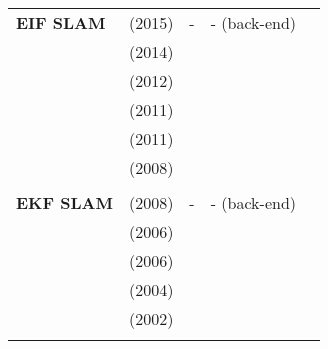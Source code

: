 \documentclass[a4paper,12pt]{scrartcl}
\begin{document}
{\begin{longtable}{l|l|l|l|l}
    \textbf{EIF SLAM}      & \cite{Samsuri2015} (2015)         & -                                                                  & - (back-end)          &\\
                           & \cite{Sola2014} (2014)            &                                                                    &                       &\\
                           & \cite{Kurt-Yavuz2012} (2012)      &                                                                    &                       &\\
                           & \cite{He2011} (2011)              &                                                                    &                       &\\
                           & \cite{AuatCheein2011} (2011)      &                                                                    &                       &\\
                           & \cite{Zhou2008} (2008)            &                                                                    &                       &\\
                           &                                   &                                                                    &                       &\\
    \textbf{EKF SLAM}      & \cite{Paz2008} (2008)             & -                                                                  & - (back-end)          &\\
                           & \cite{Bailey2006} (2006)          &                                                                    &                       &\\
                           & \cite{Bailey2006a} (2006)         &                                                                    &                       &\\
                           & \cite{Riisgaard2004} (2004)       &                                                                    &                       &\\
                           & \cite{Thrun1999} (2002)           &                                                                    &                       &\\
                           &                                   &                                                                    &                       &\\

\end{longtable}}
\end{document}
